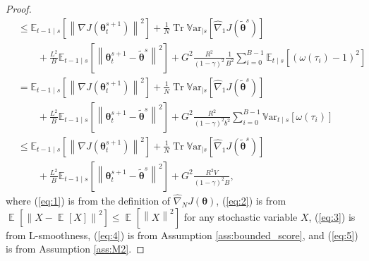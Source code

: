 \documentclass{article}
\theoremstyle{remark}
\theoremstyle{definition}
\DeclareMathOperator*{\EV}{\mathbb{E}}
\DeclareMathOperator{\Tr}{Tr}
\newcommand{\EVV}[2][\ppvect \in \ppspace]{\EV_{#1}\left[{#2}\right]}
\newcommand{\norm}[2][\infty]{\left\|#2\right\|_{#1}}
\newcommand{\vtheta}{\boldsymbol{\theta}}
\newcommand{\gradJ}[1]{\nabla J(#1)}
\newcommand{\gradApp}[2]{\hat{\nabla}_{#2}J(#1)}
\newcommand{\Ets}[2][t]{\mathbb{E}_{#1\mid s}\left[#2\right]}
\newcommand{\Varts}[2][t]{{\mathbb{V}\text{ar}}_{#1\mid s}\left[#2\right]}
\newcommand{\VARRF}{V}
\newcommand{\GRADLOG}{G}
\begin{document}
\begin{proof}
\begin{align}
	&\leq \Ets[t-1]{\norm[]{\gradJ{\vtheta_t^{s+1}}}^2} 
	+\frac{1}{N}\Tr\Varts[]{\gradApp{\tilde{\vtheta}^s}{1}}
	\nonumber\\
	&\qquad+\frac{L^2}{B}\Ets[t-1]{\norm[]{\vtheta_t^{s+1}-\tilde{\vtheta}^s}^2}
	+\GRADLOG^2\frac{R^2}{(1-\gamma)^2}\frac{1}{B^2}\sum_{i=0}^{B-1}\Ets{(\omega(\tau_i)-1)^2} \label{eq:4}\\
	&= \Ets[t-1]{\norm[]{\gradJ{\vtheta_t^{s+1}}}^2} 
	+\frac{1}{N}\Tr\Varts[]{\gradApp{\tilde{\vtheta}^s}{1}}
	\nonumber\\
	&\qquad+\frac{L^2}{B}\Ets[t-1]{\norm[]{\vtheta_t^{s+1}-\tilde{\vtheta}^s}^2}
	+\GRADLOG^2\frac{R^2}{(1-\gamma)^2b^2}\sum_{i=0}^{B-1}\Varts{\omega(\tau_i)} \nonumber\\
	&\leq \Ets[t-1]{\norm[]{\gradJ{\vtheta_t^{s+1}}}^2} 
	+\frac{1}{N}\Tr\Varts[]{\gradApp{\tilde{\vtheta}^s}{1}}
	\nonumber\\
	&\qquad+\frac{L^2}{B}\Ets[t-1]{\norm[]{\vtheta_t^{s+1}-\tilde{\vtheta}^s}^2}
	+\GRADLOG^2\frac{R^2\VARRF}{(1-\gamma)^2B}, \label{eq:5}
\end{align}
where (\ref{eq:1}) is from the definition of $\gradApp{\vtheta}{N}$, (\ref{eq:2}) is from $\EVV[]{\norm[]{X-\EVV[]{X}}^2}\leq\EVV[]{\norm[]{X}^2}$ for any stochastic variable $X$, (\ref{eq:3}) is from L-smoothness, 
(\ref{eq:4}) is from Assumption \ref{ass:bounded_score}, and (\ref{eq:5}) is from Assumption \ref{ass:M2}.
\end{proof}
\end{document}
